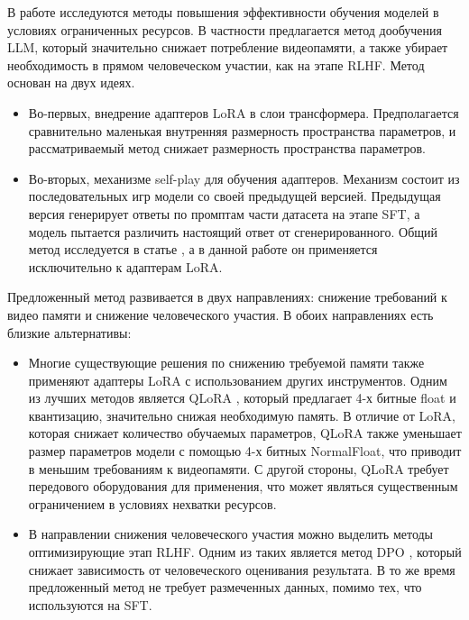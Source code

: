 \documentclass[12pt, twoside]{article}
\begin{document}
В работе исследуются методы повышения эффективности обучения моделей в условиях ограниченных ресурсов. В частности предлагается метод дообучения LLM, который значительно снижает потребление видеопамяти, а также убирает необходимость в прямом человеческом участии, как на этапе RLHF. Метод основан на двух идеях. 

\begin{itemize}
  \item Во-первых, внедрение адаптеров LoRA в слои трансформера. Предполагается сравнительно маленькая внутренняя размерность пространства параметров, и рассматриваемый метод снижает размерность пространства параметров. 
  
  \vspace{8}
   
  \item Во-вторых, механизме self-play для обучения адаптеров. Механизм состоит из последовательных игр модели со своей предыдущей версией. Предыдущая версия генерирует ответы по промптам части датасета на этапе SFT, а модель пытается различить настоящий ответ от сгенерированного. Общий метод исследуется в статье \parencite{Chen2024a}, а в данной работе он применяется исключительно к адаптерам LoRA. 
\end{itemize}

Предложенный метод развивается в двух направлениях: снижение требований к видео памяти и снижение человеческого участия. В обоих направлениях есть близкие альтернативы:

\begin{itemize}
  \item Многие существующие решения по снижению требуемой памяти также применяют адаптеры LoRA с использованием других инструментов. Одним из лучших методов является QLoRA \parencite{Dettmers2023}, который предлагает 4-х битные float и квантизацию, значительно снижая необходимую память. В отличие от LoRA, которая снижает количество обучаемых параметров, QLoRA также уменьшает размер параметров модели с помощью 4-х битных NormalFloat, что приводит в меньшим требованиям к видеопамяти. С другой стороны, QLoRA требует передового оборудования для применения, что может являться существенным ограничением в условиях нехватки ресурсов. 

  \vspace{8}
  
  \item В направлении снижения человеческого участия можно выделить методы оптимизирующие этап RLHF. Одним из таких является метод DPO \parencite{Rafailov2023a}, который снижает зависимость от человеческого оценивания результата. В то же время предложенный метод не требует размеченных данных, помимо тех, что используются на SFT.
\end{itemize}
\end{document}
